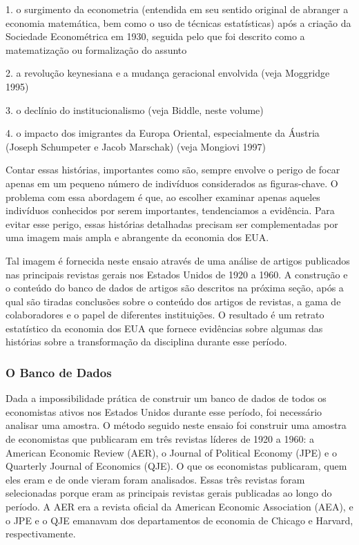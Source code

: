 \documentclass[12pt]{article}
\begin{document}
1. o surgimento da econometria (entendida em seu sentido original de abranger a economia matemática, bem como o uso de técnicas estatísticas) após a criação da Sociedade Econométrica em 1930, seguida pelo que foi descrito como a matematização ou formalização do assunto

2. a revolução keynesiana e a mudança geracional envolvida (veja Moggridge 1995)

3. o declínio do institucionalismo (veja Biddle, neste volume)

4. o impacto dos imigrantes da Europa Oriental, especialmente da Áustria (Joseph Schumpeter e Jacob Marschak) (veja Mongiovi 1997)

Contar essas histórias, importantes como são, sempre envolve o perigo de focar apenas em um pequeno número de indivíduos considerados as figuras-chave. O problema com essa abordagem é que, ao escolher examinar apenas aqueles indivíduos conhecidos por serem importantes, tendenciamos a evidência. Para evitar esse perigo, essas histórias detalhadas precisam ser complementadas por uma imagem mais ampla e abrangente da economia dos EUA.

Tal imagem é fornecida neste ensaio através de uma análise de artigos publicados nas principais revistas gerais nos Estados Unidos de 1920 a 1960. A construção e o conteúdo do banco de dados de artigos são descritos na próxima seção, após a qual são tiradas conclusões sobre o conteúdo dos artigos de revistas, a gama de colaboradores e o papel de diferentes instituições. O resultado é um retrato estatístico da economia dos EUA que fornece evidências sobre algumas das histórias sobre a transformação da disciplina durante esse período.

\subsubsection{\textbf{O Banco de Dados}}
Dada a impossibilidade prática de construir um banco de dados de todos os economistas ativos nos Estados Unidos durante esse período, foi necessário analisar uma amostra. O método seguido neste ensaio foi construir uma amostra de economistas que publicaram em três revistas líderes de 1920 a 1960: a American Economic Review (AER), o Journal of Political Economy (JPE) e o Quarterly Journal of Economics (QJE). O que os economistas publicaram, quem eles eram e de onde vieram foram analisados. Essas três revistas foram selecionadas porque eram as principais revistas gerais publicadas ao longo do período. A AER era a revista oficial da American Economic Association (AEA), e o JPE e o QJE emanavam dos departamentos de economia de Chicago e Harvard, respectivamente.
\end{document}
